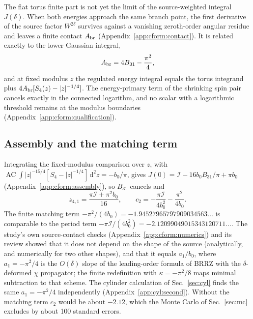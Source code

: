 \documentclass[11pt,a4paper]{article}
\numberwithin{equation}{section}
\newcommand{\dd}{\,\mathrm d}
\newcommand{\AC}{\operatorname{AC}}
\newcommand{\cI}{\mathcal I}
\begin{document}
The flat torus finite part is not yet the limit of the source-weighted integral $J(\delta)$. When both energies
approach the same branch point, the first derivative of the source factor $W^{2\delta}$ survives against a vanishing
zeroth-order angular residue and leaves a finite contact $A_{\rm br}$ (Appendix~\ref{app:cform:contact}). It is
related exactly to the lower Gaussian integral,
\begin{equation}
 A_{\rm br}=4B_{31}-\frac{\pi^2}{4},
\end{equation}
and at fixed modulus $z$ the regulated energy integral equals the torus integrand plus $4A_{\rm br}[S_4(z)-|z|^{-1/4}]$.
The energy-primary term of the shrinking spin pair cancels exactly in the connected logarithm, and no scalar with a
logarithmic threshold remains at the modulus boundaries (Appendix~\ref{app:cform:qualification}).

\subsection{Assembly and the matching term}\label{sec:assembly2}
Integrating the fixed-modulus comparison over $z$, with $\AC\!\int|z|^{-15/4}[S_4-|z|^{-1/4}]\dd^2z=-b_0/\pi$, gives
$J(0)=\cI-16b_0B_{31}/\pi+\pi b_0$ (Appendix~\ref{app:cform:assembly}), so $B_{31}$ cancels and
\begin{equation}
 z_{4,1}=\frac{\pi\cI+\pi^2b_0}{16},\qquad
 \boxed{c_2=-\frac{\pi\cI}{4b_0^2}-\frac{\pi^2}{4b_0}.}
 \label{eq:c2I}
\end{equation}
The finite matching term $-\pi^2/(4b_0)=-1.94527965797909034563\ldots$ is comparable to the period term
$-\pi\cI/(4b_0^2)=-2.12099049015343120711\ldots$. The study's own source-contact checks (Appendix~\ref{app:cform:numerics}) and its review showed that
it does not depend on the shape of the source (analytically, and numerically for two other shapes), and that it equals $a_1/b_0$, where $a_1=-\pi^2/4$
is the $O(\delta)$ slope of the leading-order formula of BRRZ with the $\delta$-deformed $\chi$ propagator; the finite
redefinition with $\kappa=-\pi^2/8$ maps minimal subtraction to that scheme. The cylinder calculation of
Sec.~\ref{sec:cyl} finds the same $a_1=-\pi^2/4$ independently (Appendix~\ref{app:cyl:second}). Without the matching term $c_2$ would be about $-2.12$,
which the Monte Carlo of Sec.~\ref{sec:mc} excludes by about 100 standard errors.
\end{document}
